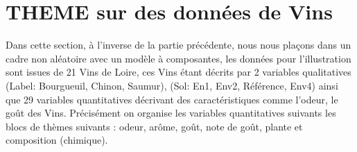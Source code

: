 \documentclass[a4paper,french,10pt]{article}
\begin{document}



\newpage

\section{THEME sur des données de Vins}

Dans cette section, à l'inverse de la partie précédente, nous nous plaçons dans un cadre non aléatoire avec un modèle à composantes, les données pour l'illustration sont issues de 21 Vins de Loire, ces Vins étant décrits par 2 variables qualitatives (Label: Bourgueuil, Chinon, Saumur), (Sol: En1, Env2, Référence, Env4) ainsi que 29 variables quantitatives décrivant des
caractéristiques comme l’odeur, le goût des Vins. \newline
Précisément on organise les variables quantitatives suivants les blocs de thèmes suivants : odeur, arôme, goût, note de goût, plante et composition (chimique).\newline
\end{document}
